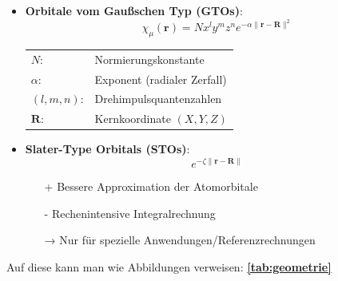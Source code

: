 \begin{itemize}
    \item \textbf{Orbitale vom Gaußschen Typ (GTOs)}: 
    \begin{equation}
        \chi_\mu(\mathbf{r}) = N x^{l} y^{m} z^{n} e^{-\alpha \|\mathbf{r} - \mathbf{R}\|^2}
    \end{equation}
    \begin{tabular}{@{}ll@{}}
        \( N \): & Normierungskonstante \\
        \( \alpha \): & Exponent (radialer Zerfall) \\
        \( (l, m, n) \): & Drehimpulsquantenzahlen \\
        \( \mathbf{R} \): & Kernkoordinate \((X, Y, Z)\)
    \end{tabular}
    \autocite{Reinhold2015}

    \item \textbf{Slater-Type Orbitals (STOs)}: 
    \[ e^{-\zeta \|\mathbf{r} - \mathbf{R}\|} \]
    \begin{itemize}
        \item[+] Bessere Approximation der Atomorbitale
        \item[-] Rechenintensive Integralrechnung
        \item[→] Nur für spezielle Anwendungen/Referenzrechnungen
    \end{itemize}
    \autocite{Reinhold2015,Zülicke2015,Nicolaou}
\end{itemize}

Auf diese kann man wie Abbildungen verweisen: \textbf{\cref{tab:geometrie}}


